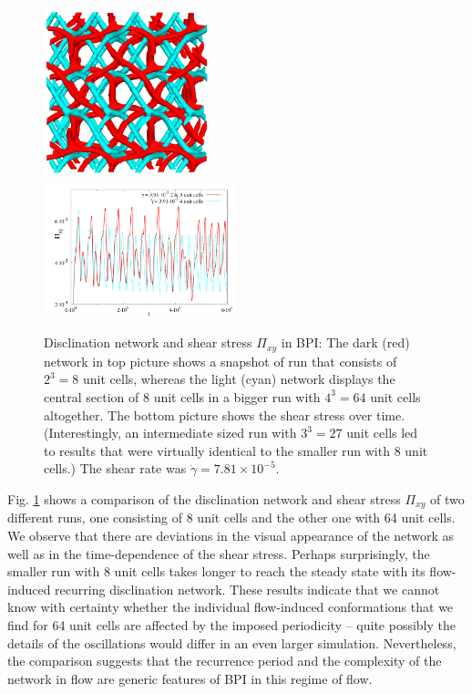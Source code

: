 \documentclass[8.5pt,twoside,twocolumn]{article}
\newcommand{\e}[1]{\times10^{#1}}
\newcommand{\gd}{\dot{\gamma}}
\begin{document}
\begin{figure}[htpb]
\includegraphics[width=0.43\textwidth]{disc+y-600k-run911_run1163.png}\\
\includegraphics[width=0.495\textwidth]{stress_bp1_2uc_4uc.pdf}
\caption{Disclination network and shear stress $\Pi_{xy}$ in BPI: 
The dark (red) network in top picture shows a snapshot of run that consists 
of $2^3=8$ unit cells, whereas the light (cyan) network displays the 
central section of 8 unit cells in a bigger run with $4^3=64$ unit cells altogether. 
The bottom picture shows the shear stress over time. (Interestingly, 
an intermediate sized run with $3^3=27$ unit cells led to results that 
were virtually identical to the smaller run with 8 unit cells.) 
The shear rate was $\gd=7.81\e{-5}$.
}
\label{bp1-2uc4uc}
\end{figure}
 
Fig. \ref{bp1-2uc4uc} shows a comparison of the disclination network and 
shear stress $\Pi_{xy}$ of two different runs, one consisting of 8 
unit cells and the other one with 64 unit cells.
We observe that there are deviations in the visual appearance of the 
network as well as in the time-dependence of the shear stress.
Perhaps surprisingly, the smaller run with 8 unit cells takes longer 
to reach the steady state with its flow-induced recurring disclination network. 
These results indicate that we cannot know with certainty whether the individual 
flow-induced conformations that we find for 64 unit cells are affected 
by the imposed periodicity -- quite possibly the details of the oscillations
would differ in an even larger simulation. 
Nevertheless, the comparison suggests that 
the recurrence period and the complexity of the network in flow are  
generic features of BPI in this regime of flow.
\end{document}
